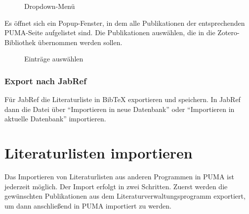 \begin{figure}[h!]
 \centering
 \caption{Dropdown-Menü}
 \label{fig:dropdownMenue}
\end{figure}

Es öffnet sich ein Popup-Fenster, in dem alle Publikationen der entsprechenden PUMA-Seite aufgelistet sind. Die Publikationen auswählen, die in die Zotero-Bibliothek übernommen werden sollen.
\begin{figure}[h!]
 \centering
 \caption{Einträge auswählen}
 \label{fig:eintraegeAuswaehlen}
\end{figure}


\subsubsection*{Export nach JabRef}\label{sss:exportJabref}
Für JabRef die Literaturliste in BibTeX exportieren und speichern. In JabRef dann die Datei über \enquote{Importieren in neue Datenbank} oder \enquote{Importieren in aktuelle Datenbank} importieren.

\section{Literaturlisten importieren}
\label{sec:llImportieren}
Das Importieren von Literaturlisten aus anderen Programmen in PUMA ist jederzeit möglich. Der Import erfolgt in zwei Schritten. Zuerst werden die gewünschten Publikationen aus dem Literaturverwaltungsprogramm exportiert, um dann anschließend in PUMA importiert zu werden. 
